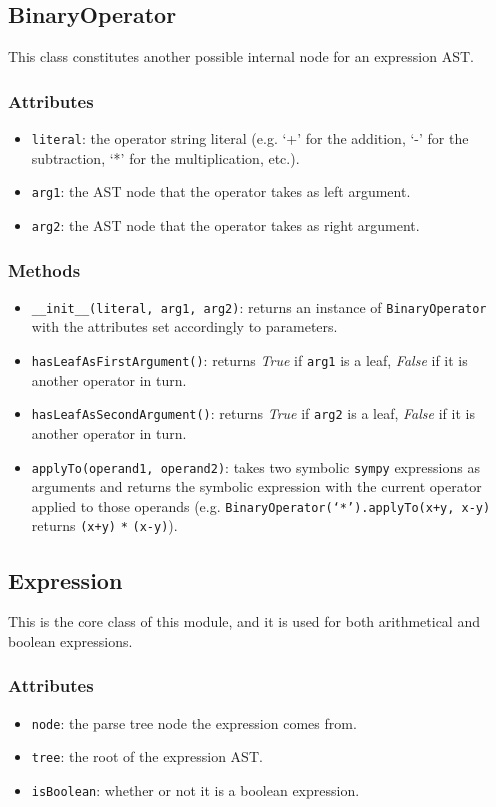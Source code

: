\documentclass[12pt,a4paper]{report}
\theoremstyle{definition}
\theoremstyle{definition}
\theoremstyle{definition}
\begin{document}
\pagebreak

\subsection{BinaryOperator}
This class constitutes another possible internal node for an expression AST.
\subsubsection{Attributes}
\begin{itemize}
    \itemsep 0em
    \item \texttt{literal}: the operator string literal (e.g. `+' for the addition, `-' for the subtraction, `*' for the multiplication, etc.).
    \item \texttt{arg1}: the AST node that the operator takes as left argument.
    \item \texttt{arg2}: the AST node that the operator takes as right argument.
\end{itemize}
\subsubsection{Methods}
\begin{itemize}
    \itemsep 0em
    \item \texttt{\_\_init\_\_(literal, arg1, arg2)}: returns an instance of \texttt{BinaryOperator} with the attributes set accordingly to parameters.
    \item \texttt{hasLeafAsFirstArgument()}: returns \textit{True} if \texttt{arg1} is a leaf, \textit{False} if it is another operator in turn.
    \item \texttt{hasLeafAsSecondArgument()}: returns \textit{True} if \texttt{arg2} is a leaf, \textit{False} if it is another operator in turn.
    \item \texttt{applyTo(operand1, operand2)}: takes two symbolic \texttt{sympy} expressions as arguments and returns the symbolic expression with the current operator applied to those operands (e.g. \texttt{BinaryOperator(`*').applyTo(x+y, x-y)} returns \texttt{(x+y)} \texttt{*} \texttt{(x-y)}).
\end{itemize}

\subsection{Expression}
This is the core class of this module, and it is used for both arithmetical and boolean expressions.
\subsubsection{Attributes}
\begin{itemize}
    \itemsep 0em
    \item \texttt{node}: the parse tree node the expression comes from.
    \item \texttt{tree}: the root of the expression AST.
    \item \texttt{isBoolean}: whether or not it is a boolean expression.
\end{itemize}
\end{document}
